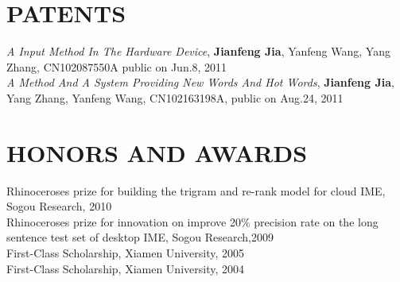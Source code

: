 \documentclass{res}
\begin{document}
\begin{resume}


\section{PATENTS}
\emph{A Input Method In The Hardware Device}, \textbf{Jianfeng Jia}, Yanfeng Wang, Yang Zhang, CN102087550A public on Jun.8, 2011\\
\emph{A Method And A System Providing New Words And Hot Words}, \textbf{Jianfeng Jia}, Yang Zhang, Yanfeng Wang, CN102163198A, public on Aug.24, 2011 \\



\section{HONORS AND AWARDS}             
     Rhinoceroses prize for building the trigram and re-rank model for cloud IME, Sogou Research, 2010 \\
     Rhinoceroses prize for innovation on improve 20\% precision rate on the long sentence test set of desktop IME, Sogou Research,2009 \\
     First-Class Scholarship, Xiamen University, 2005 \\
     First-Class Scholarship, Xiamen University, 2004 


\end{resume}
\end{document}
